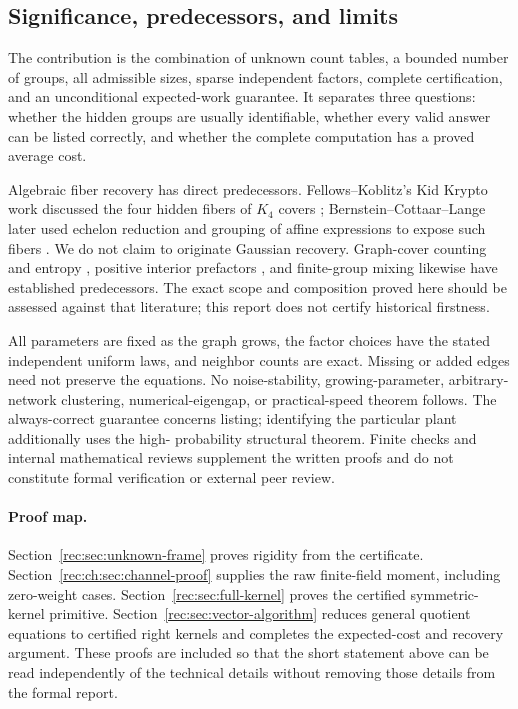 \documentclass[11pt]{article}
\theoremstyle{definition}
\theoremstyle{remark}
\newcommand{\1}{\mathbf 1}
\begin{document}
\subsection{Significance, predecessors, and limits}
The contribution is the combination of unknown count tables, a bounded
number of groups, all admissible sizes, sparse independent factors,
complete certification, and an unconditional expected-work guarantee.
It separates three questions: whether the hidden groups are usually
identifiable, whether every valid answer can be listed correctly, and
whether the complete computation has a proved average cost.

Algebraic fiber recovery has direct predecessors. Fellows--Koblitz's
Kid Krypto work discussed the four hidden fibers of $K_4$ covers
\cite{rec:KidKrypto}; Bernstein--Cottaar--Lange later used echelon
reduction and grouping of affine expressions to expose such fibers
\cite{rec:BCL}. We do not claim to originate Gaussian recovery.
Graph-cover counting and entropy \cite{rec:Vontobel}, positive interior
prefactors \cite{rec:MoriTanaka}, and finite-group mixing
\cite{rec:Meszaros} likewise have established predecessors.
The exact scope and composition proved here should be assessed against
that literature; this report does not certify historical firstness.

All parameters are fixed as the graph grows, the factor choices have
the stated independent uniform laws, and neighbor counts are exact.
Missing or added edges need not preserve the equations. No noise-stability,
growing-parameter, arbitrary-network clustering, numerical-eigengap,
or practical-speed theorem follows. The always-correct guarantee concerns
listing; identifying the particular plant additionally uses the high-
probability structural theorem. Finite checks and internal mathematical
reviews supplement the written proofs and do not constitute formal
verification or external peer review.

\paragraph{Proof map.}
Section~\ref{rec:sec:unknown-frame} proves rigidity from the certificate.
Section~\ref{rec:ch:sec:channel-proof} supplies the raw finite-field moment,
including zero-weight cases. Section~\ref{rec:sec:full-kernel} proves the
certified symmetric-kernel primitive. Section~\ref{rec:sec:vector-algorithm}
reduces general quotient equations to certified right kernels and completes
the expected-cost and recovery argument. These proofs are included so
that the short statement above can be read independently of the technical
details without removing those details from the formal report.
\end{document}
